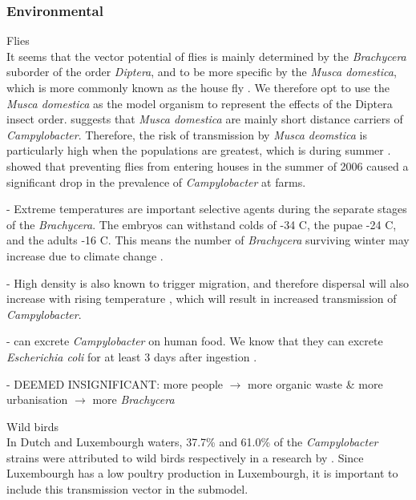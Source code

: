 \subsubsection*{Environmental}

\textcolor{AMAZINGPINK}{Flies} \\
It seems that the vector potential of flies is mainly determined by the \textit{Brachycera} suborder of the order \textit{Diptera}, and to be more specific by the \textit{Musca domestica}, which is more commonly known as the house fly \parencite{hald_influxed_2008}. We therefore opt to use the \textit{Musca domestica} as the model organism to represent the effects of the Diptera insect order. \cite{skovgard_retention_2011} suggests that \textit{Musca domestica} are mainly short distance carriers of \textit{Campylobacter}. Therefore, the risk of transmission by \textit{Musca deomstica} is particularly high when the populations are greatest, which is during summer \parencite{royden_role_2016}. \cite{hald_use_2007} showed that preventing flies from entering houses in the summer of 2006 caused a significant drop in the prevalence of \textit{Campylobacter} at farms.


- Extreme temperatures are important selective agents during the separate stages of the \textit{Brachycera}. The embryos can withstand colds of -34 \degree C, the pupae -24 \degree C, and the adults -16 \degree C.  This means the number of \textit{Brachycera} surviving winter may increase due to climate change \parencite{goulson_predicting_2005}.

- High density is also known to trigger migration, and therefore dispersal will also increase with rising temperature \parencite{feder_locomotion_2010}, which will result in increased transmission of \textit{Campylobacter}.

-  can excrete \textit{Campylobacter}  on human food. We know that they can excrete \textit{Escherichia coli} for at least 3 days after ingestion \parencite{sasaki_epidemiological_2000}.


- DEEMED INSIGNIFICANT: more people $\to$ more organic waste \parencite{garcia-garcia_framework_2015} \& more urbanisation $\to$ more \textit{Brachycera} \parencite{imai_population_1984, rozendaal_houseflies_1997} %

\textcolor{AMAZINGPINK}{Wild birds} \\
In Dutch and Luxembourgh waters, 37.7\% and 61.0\% of the \textit{Campylobacter} strains were attributed to wild birds respectively in a research by \cite{mughini-gras_quantifying_2016}. Since Luxembourgh has a low poultry production in Luxembourgh, it is important to include this transmission vector in the submodel.

